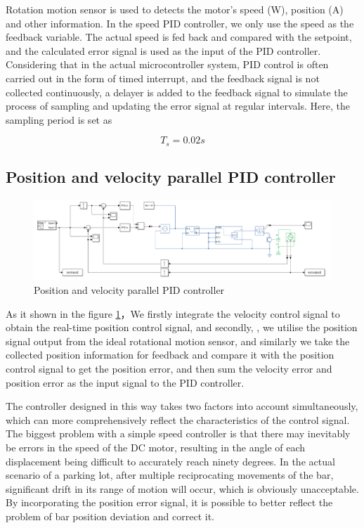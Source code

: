 \documentclass[11pt,a4paper]{article}%
\begin{document}
Rotation motion sensor is used to detects the motor's speed (W), position (A) and other information. In the speed PID controller, we only use the speed as the feedback variable.
The actual speed is fed back and compared with the setpoint, and the calculated error signal is used as the input of the PID controller. 
Considering that in the actual microcontroller system, PID control is often carried out in the form of timed interrupt, and the feedback signal is not collected continuously, a delayer is added to the feedback signal to simulate the process of sampling and updating the error signal at regular intervals.
Here, the sampling period is set as

\begin{equation}
    T_s = 0.02s
\end{equation}

\subsection{Position and velocity parallel PID controller}
\begin{figure}[H]
    \centering
    \includegraphics[width=1\textwidth]{controller2}
    \caption{Position and velocity parallel PID controller}
    \label{controller2}
\end{figure}
As it shown in the figure \ref{controller2}，We firstly integrate the velocity control signal to obtain the real-time position control signal, and secondly, 
, we utilise the position signal output from the ideal rotational motion sensor, and similarly we take the collected position information for
feedback and compare it with the position control signal to get the position error, and then sum the velocity error and position error as the input signal to the PID controller.


The controller designed in this way takes two factors into account simultaneously, which can more comprehensively reflect the characteristics of the control signal. The biggest problem with a simple speed controller is that there may inevitably be errors in the speed of the DC motor, resulting in the angle of each displacement being difficult to accurately reach ninety degrees. In the actual scenario of a parking lot, after multiple reciprocating movements of the bar, significant drift in its range of motion will occur, which is obviously unacceptable. By incorporating the position error signal, it is possible to better reflect the problem of bar position deviation and correct it.
\end{document}
